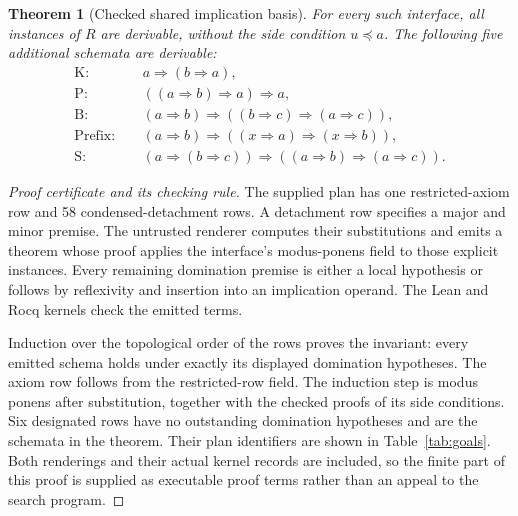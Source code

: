 \documentclass[11pt]{article}
\newtheorem{theorem}{Theorem}[section]
\newcommand{\Imp}{\mathbin{\Rightarrow}}
\newcommand{\Below}{\mathrel{\preccurlyeq}}
\begin{document}
\begin{theorem}[Checked shared implication basis]\label{thm:basis}
For every such interface, all instances of $R$ are derivable, without the side condition $u\Below a$. The following five additional schemata are derivable:
\begin{align*}
\mathrm{K}:&\quad a\Imp(b\Imp a),\\
\mathrm{P}:&\quad ((a\Imp b)\Imp a)\Imp a,\\
\mathrm{B}:&\quad(a\Imp b)\Imp((b\Imp c)\Imp(a\Imp c)),\\
\mathrm{Prefix}:&\quad(a\Imp b)\Imp((x\Imp a)\Imp(x\Imp b)),\\
\mathrm{S}:&\quad(a\Imp(b\Imp c))\Imp((a\Imp b)\Imp(a\Imp c)).
\end{align*}
\end{theorem}

\begin{proof}[Proof certificate and its checking rule]
The supplied plan has one restricted-axiom row and 58 condensed-detachment rows. A detachment row specifies a major and minor premise. The untrusted renderer computes their substitutions and emits a theorem whose proof applies the interface's modus-ponens field to those explicit instances. Every remaining domination premise is either a local hypothesis or follows by reflexivity and insertion into an implication operand. The Lean and Rocq kernels check the emitted terms.

Induction over the topological order of the rows proves the invariant: every emitted schema holds under exactly its displayed domination hypotheses. The axiom row follows from the restricted-row field. The induction step is modus ponens after substitution, together with the checked proofs of its side conditions. Six designated rows have no outstanding domination hypotheses and are the schemata in the theorem. Their plan identifiers are shown in Table~\ref{tab:goals}. Both renderings and their actual kernel records are included, so the finite part of this proof is supplied as executable proof terms rather than an appeal to the search program.
\end{proof}
\end{document}
